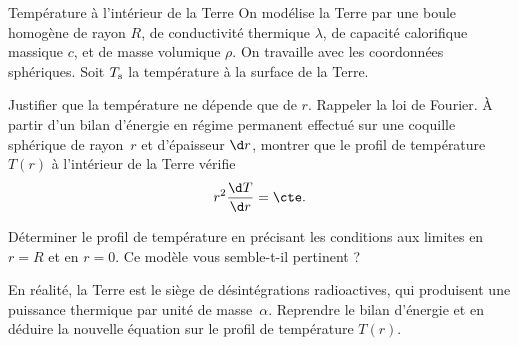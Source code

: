 \begin{exo}[PSI][2][TD]{Température à l'intérieur de la Terre}
On modélise la Terre par une boule homogène de rayon $R$, de conductivité thermique $\lambda$, de capacité calorifique massique $c$, et de masse volumique $\rho$. On travaille avec les coordonnées sphériques.
Soit  $T_{\rm s}$ la température à la surface de la Terre.

\begin{quest}
\item Justifier que la température ne dépende que de $r$. Rappeler la loi de Fourier. À partir d'un bilan d'énergie en régime permanent effectué sur une coquille sphérique de rayon~$r$ et d’épaisseur $\d r$, montrer que le profil de température $T(r)$ à l'intérieur de la Terre vérifie
\begin{equation}
r^2\dfrac{\d T}{\d r}  = \cte.
\end{equation}


\item Déterminer le profil de température en précisant les conditions aux limites en $r=R$ et en $r=0$. Ce modèle vous semble-t-il pertinent ?


\item En réalité, la Terre est le siège de désintégrations radioactives, qui produisent une puissance thermique par unité de masse~$\alpha$. Reprendre le bilan d'énergie et en déduire la nouvelle équation sur le profil de température $T(r)$.



\end{quest}
\end{exo}
